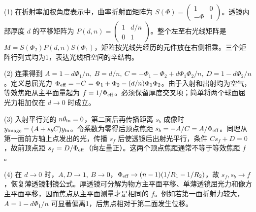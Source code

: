 (1) 在折射率加权角度表示中，曲率折射面矩阵为 \(S(\Phi)=\begin{pmatrix}1&0\\-\Phi&1\end{pmatrix}\)。透镜内部厚度 \(d\) 的平移矩阵为 \(P(d,n)=\begin{pmatrix}1&d/n\\0&1\end{pmatrix}\)。整个左至右光线矩阵是 \(M=S(\Phi_2)P(d,n)S(\Phi_1)\)，矩阵按光线先经历的元件放在右侧相乘。三个矩阵行列式均为1，表达光线相空间的辛结构。

(2) 连乘得到 \(A=1-d\Phi_1/n,\ B=d/n,\ C=-\Phi_1-\Phi_2+d\Phi_1\Phi_2/n,\ D=1-d\Phi_2/n\)。定义总屈光力 \(\Phi_{\rm eff}=-C=\Phi_1+\Phi_2-(d/n)\Phi_1\Phi_2\)。由于入射和出射均为空气，等效焦距从主平面量起为 \(f=1/\Phi_{\rm eff}\)。必须保留厚度交叉项；简单将两个球面屈光力相加仅在 \(d\to0\) 时成立。

(3) 入射平行光的 \(n\theta_{\rm in}=0\)，第二面后再传播距离 \(s_b\) 成像时 \(y_{\rm image}=(A+s_bC)y_{\rm in}\)。令系数为零得后顶点焦距 \(s_b=-A/C=A/\Phi_{\rm eff}\)。同理从第一面前方轴上点发出的光，传播 \(s_f\) 后使透镜后出射光平行，条件 \(Cs_f+D=0\)，故前顶点距 \(s_f=D/\Phi_{\rm eff}\)（向左量正）。这两个顶点焦距通常不等于等效焦距 \(f\)。

(4) 在 \(d\to0\) 时，\(A,D\to1,\ B\to0\)，\(\Phi_{\rm eff}\to(n-1)(1/R_1-1/R_2)\)，故 \(s_f,s_b\to f\)，恢复薄透镜制镜公式。厚透镜可分解为物方主平面平移、单薄透镜屈光力和像方主平面平移，因而焦点从主平面测量才是相同的 \(f\)。例如若第一面折射力较大，\(A=1-d\Phi_1/n\) 可显著偏离1，后焦点相对于第二面发生位移。
